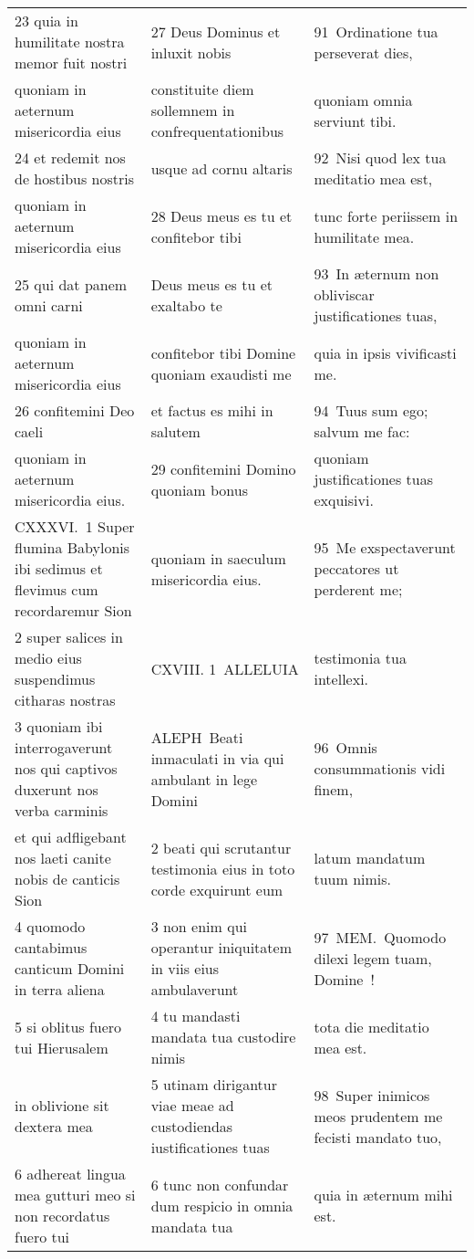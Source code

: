 \documentclass{article}
\begin{document}
\begin{longtable}{@{}p{}p{}p{}@{}}
23 quia in humilitate nostra memor fuit nostri	&	27 Deus Dominus et inluxit nobis	&	91 Ordinatione tua perseverat dies,	\\
quoniam in aeternum misericordia eius	&	constituite diem sollemnem in confrequentationibus	&	quoniam omnia serviunt tibi.	\\
24 et redemit nos de hostibus nostris	&	usque ad cornu altaris	&	92 Nisi quod lex tua meditatio mea est,	\\
quoniam in aeternum misericordia eius	&	28 Deus meus es tu et confitebor tibi	&	tunc forte periissem in humilitate mea.	\\
25 qui dat panem omni carni	&	Deus meus es tu et exaltabo te	&	93 In æternum non obliviscar justificationes tuas,	\\
quoniam in aeternum misericordia eius	&	confitebor tibi Domine quoniam exaudisti me	&	quia in ipsis vivificasti me.	\\
26 confitemini Deo caeli	&	et factus es mihi in salutem	&	94 Tuus sum ego; salvum me fac:	\\
quoniam in aeternum misericordia eius.	&	29 confitemini Domino quoniam bonus	&	quoniam justificationes tuas exquisivi.	\\
CXXXVI. 1 Super flumina Babylonis ibi sedimus et flevimus cum recordaremur Sion	&	quoniam in saeculum misericordia eius.	&	95 Me exspectaverunt peccatores ut perderent me;	\\
2 super salices in medio eius suspendimus citharas nostras	&	CXVIII. 1 ALLELUIA	&	testimonia tua intellexi.	\\
3 quoniam ibi interrogaverunt nos qui captivos duxerunt nos verba carminis	&	ALEPH Beati inmaculati in via qui ambulant in lege Domini	&	96 Omnis consummationis vidi finem,	\\
et qui adfligebant nos laeti canite nobis de canticis Sion	&	2 beati qui scrutantur testimonia eius in toto corde exquirunt eum	&	latum mandatum tuum nimis.	\\
4 quomodo cantabimus canticum Domini in terra aliena	&	3 non enim qui operantur iniquitatem in viis eius ambulaverunt	&	97 MEM. Quomodo dilexi legem tuam, Domine !	\\
5 si oblitus fuero tui Hierusalem	&	4 tu mandasti mandata tua custodire nimis	&	tota die meditatio mea est.	\\
in oblivione sit dextera mea	&	5 utinam dirigantur viae meae ad custodiendas iustificationes tuas	&	98 Super inimicos meos prudentem me fecisti mandato tuo,	\\
6 adhereat lingua mea gutturi meo si non recordatus fuero tui	&	6 tunc non confundar dum respicio in omnia mandata tua	&	quia in æternum mihi est.	\\

\end{longtable}
\end{document}
